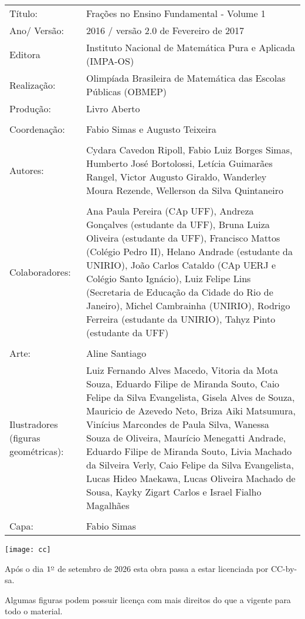 \documentclass[a4,12pt]{book} %
\begin{document}
\begin{changemargin}{-5cm}{-5cm}
{\begin{center}
\begin{tabular}{p{}p{}}
Título: & Frações no Ensino Fundamental - Volume 1\\
Ano/ Versão: & 2016 / versão 2.0 de Fevereiro de 2017 \\
Editora & Instituto Nacional de Matem\'atica Pura e Aplicada (IMPA-OS)\\
Realização:& Olimp\'iada Brasileira de Matem\'atica das Escolas P\'ublicas (OBMEP)\\
Produção:& Livro Aberto\\
\\
Coordenação: & Fabio Simas e Augusto Teixeira\\
\\
Autores: & Cydara Cavedon Ripoll, Fabio Luiz Borges Simas, Humberto José Bortolossi, Letícia Guimarães Rangel, Victor Augusto Giraldo, Wanderley Moura Rezende, Wellerson  da Silva Quintaneiro\\
\\
Colaboradores: & Ana Paula Pereira (CAp UFF), Andreza Gonçalves (estudante da UFF), Bruna Luiza Oliveira (estudante da UFF), Francisco Mattos (Colégio Pedro II), Helano Andrade (estudante da UNIRIO), João Carlos Cataldo (CAp UERJ e Colégio Santo Ignácio), Luiz Felipe Lins (Secretaria de Educação da Cidade do Rio de Janeiro), Michel Cambrainha (UNIRIO), Rodrigo Ferreira (estudante da UNIRIO), Tahyz Pinto (estudante da UFF) \\
\\
Arte: & Aline Santiago
\\
Ilustradores (figuras geométricas): & Luiz Fernando Alves Macedo,
Vitoria da Mota Souza,
Eduardo Filipe de Miranda Souto,
Caio Felipe da Silva Evangelista,
Gisela Alves de Souza,
Mauricio de Azevedo Neto,
Briza Aiki Matsumura,
Vinícius Marcondes de Paula Silva,
Wanessa Souza de Oliveira,
Maurício Menegatti Andrade,
Eduardo Filipe de Miranda Souto,
Livia Machado da Silveira Verly,
Caio Felipe da Silva Evangelista,
Lucas Hideo Maekawa,
Lucas Oliveira Machado de Sousa,
Kayky Zigart Carlos e
Israel Fialho Magalhães\\
\\
Capa: & Fabio Simas
\end{tabular}
\vspace{.2cm}

\texttt{[image: cc]}

Após o dia $1^{\textrm{\underline{o}}}$ de setembro de 2026 esta obra passa a estar licenciada por CC-by-sa.

Algumas figuras podem possuir licença com mais direitos do que a vigente para todo o material.
\end{center}
}
\end{changemargin}
\end{document}
